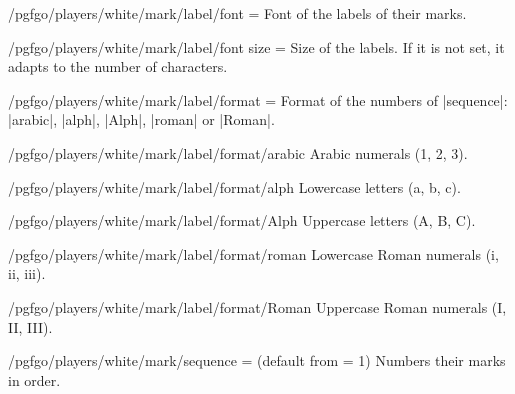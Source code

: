 \begin{goban}[9, stone = {radius = 4pt}, mark = {line = {color = red}}]
\begin{key}{/pgfgo/players/white/mark/label/font = }
	Font of the labels of their marks.
\end{key}

\begin{key}{/pgfgo/players/white/mark/label/font size = }
	Size of the labels. If it is not set, it adapts to the number of characters.
\end{key}

\begin{key}{/pgfgo/players/white/mark/label/format = }
	Format of the numbers of |sequence|: |arabic|, |alph|, |Alph|, |roman| or |Roman|.
\end{key}

\begin{key}{/pgfgo/players/white/mark/label/format/arabic}
	Arabic numerals (1, 2, 3).
\end{key}

\begin{key}{/pgfgo/players/white/mark/label/format/alph}
	Lowercase letters (a, b, c).
\end{key}

\begin{key}{/pgfgo/players/white/mark/label/format/Alph}
	Uppercase letters (A, B, C).
\end{key}

\begin{key}{/pgfgo/players/white/mark/label/format/roman}
	Lowercase Roman numerals (i, ii, iii).
\end{key}

\begin{key}{/pgfgo/players/white/mark/label/format/Roman}
	Uppercase Roman numerals (I, II, III).
\end{key}

\begin{key}{/pgfgo/players/white/mark/sequence =  (default from = 1)}
	Numbers their marks in order.

	\begin{codeexample}[width=4cm]

		\begin{goban}[3]
		\end{goban}
	\end{codeexample}
\end{key}


\end{goban}
